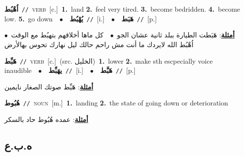 \documentclass[10pt,a4paper,twoside]{article} %
\begin{document}
\begin{multicols}{2}
{{{{\setlength\topsep{0pt}\textbf{\foreignlanguage{arabic}{اُهْبُط}}\ {\color{gray}\texttt{//}\color{black}}\ \textsc{verb}\ [c.]\ \textbf{1.}~land  \textbf{2.}~feel very tired.  \textbf{3.}~become bedridden.  \textbf{4.}~become low.  \textbf{5.}~go down\ \ $\bullet$\ \ \setlength\topsep{0pt}\textbf{\foreignlanguage{arabic}{يُهْبُط}}\ {\color{gray}\texttt{//}\color{black}}\ [i.]\ \ $\bullet$\ \ \setlength\topsep{0pt}\textbf{\foreignlanguage{arabic}{هَبَط}}\ {\color{gray}\texttt{//}\color{black}}\ [p.]\  \begin{flushright}\color{gray}\foreignlanguage{arabic}{\textbf{\underline{\foreignlanguage{arabic}{أمثلة}}}: هَبَطت الطيارة ببلد ثانية عشان الجو\ $\bullet$\ \  كل ماها أخلاقهم بتهبُط مع الوقت\ $\bullet$\ \  اُهْبُط الله لايردك ما أنت مش راحم حالك ليل نهارك تحوس بهالأرض}\end{flushright}\color{black}} \vspace{2mm}

{\setlength\topsep{0pt}\textbf{\foreignlanguage{arabic}{هَبِّط}}\ {\color{gray}\texttt{//}\color{black}}\ \textsc{verb}\ [c.]\ (src. \color{gray}\foreignlanguage{arabic}{الخليل}\color{black})\ \textbf{1.}~lower  \textbf{2.}~make sth escpecially voice inaudible\ \ $\bullet$\ \ \setlength\topsep{0pt}\textbf{\foreignlanguage{arabic}{يهَبِّط}}\ {\color{gray}\texttt{//}\color{black}}\ [i.]\ \ $\bullet$\ \ \setlength\topsep{0pt}\textbf{\foreignlanguage{arabic}{هَبَّط}}\ {\color{gray}\texttt{//}\color{black}}\ [p.]\  \begin{flushright}\color{gray}\foreignlanguage{arabic}{\textbf{\underline{\foreignlanguage{arabic}{أمثلة}}}: هَبِّط صوتك الصغار نايمين}\end{flushright}\color{black}} \vspace{2mm}

{\setlength\topsep{0pt}\textbf{\foreignlanguage{arabic}{هُبُوط}}\ {\color{gray}\texttt{//}\color{black}}\ \textsc{noun}\ [m.]\ \textbf{1.}~landing  \textbf{2.}~the state of going down or deterioration\  \begin{flushright}\color{gray}\foreignlanguage{arabic}{\textbf{\underline{\foreignlanguage{arabic}{أمثلة}}}: عمده هُبُوط حاد بالسكر}\end{flushright}\color{black}} \vspace{2mm}

\vspace{-3mm}
\subsection*{\color{blue}\foreignlanguage{arabic}{ه.ب.ع}\color{blue}{}} 

}}}
\end{multicols}
\end{document}
